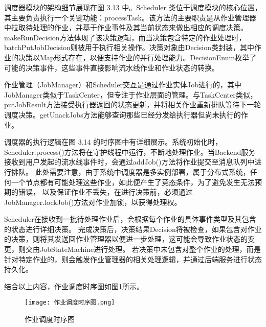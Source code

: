 调度器模块的架构细节展现在图 3.13 中。Scheduler 类位于调度模块的核心位置，其主要负责执行一个关键功能：processTask。该方法的主要职责是从作业管理器中拉取待处理的作业，并基于作业事件及其当前状态来做出相应的调度决策。makeRunDecision方法体现了该决策逻辑，而当决策包含特定的作业处理时，batchPutJobDecision则被用于执行相关操作。决策对象由Decision类封装，其中作业的决策以Map形式存在，以便支持作业的并行处理能力。DecisionEnum枚举了可能的决策事件，这些事件直接影响流水线作业和作业状态的转换。

作业管理（JobManager）和Scheduler交互是通过作业实体Job进行的，其中JobManager类似于TaskCenter，但专注于作业层面的管理。与TaskCenter类似，putJobResult方法接受执行器返回的状态更新，并将相关作业重新排队等待下一轮调度决策。getUnackJobs方法能够查询那些已经分发给执行器但尚未执行的作业。

调度器的执行逻辑在图 3.14 的时序图中有详细展示。系统初始化时，Scheduler.process()方法将在守护线程中运行，不断地处理作业。当Backend服务接收到用户发起的流水线事件时，会通过addJob()方法将作业提交至消息队列中进行排队。
此处需要注意，由于系统中调度器是多实例部署，属于分布式系统，任何一个节点都有可能处理这些作业，如此便产生了竞态条件，为了避免发生无法预期的错误，
以及保证作业不丢失，在进行决策前，必须通过JobManager.lockJob()方法对作业加锁，以获得处理权。

Scheduler在接收到一批待处理作业后，会根据每个作业的具体事件类型及其包含的状态进行详细决策。
完成决策后，决策结果Decision将被检查，如果包含对作业的决策，则将其发送回作业管理器以便进一步处理，这可能会导致作业状态的变更，则交由JobStateMachine进行处理。
若决策中未包含对整个作业的处理，而是针对特定作业的，则会触发作业管理器的相关处理逻辑，并通过后端服务进行状态持久化。

结合以上内容，作业调度时序图如图\ref{fig:作业调度时序图}所示。

\begin{figure}[h]
  \centering
  \texttt{[image: 作业调度时序图.png]}
  \caption{作业调度时序图}
  \label{fig:作业调度时序图}
\end{figure}

